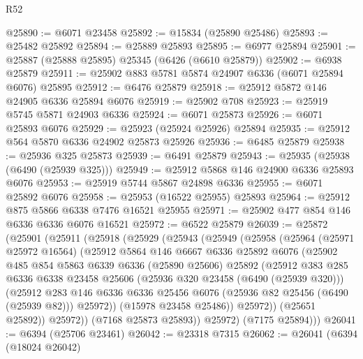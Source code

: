 \begin{lexlean}{R52}
\begin{coremodule}
@25890 := @6071 @23458
@25892 := @15834 (@25890 @25486)
@25893 := @25482 @25892
@25894 := @25889 @25893
@25895 := @6977 @25894
@25901 := @25887 (@25888 @25895) @25345 (@6426 (@6610 @25879))
@25902 := @6938 @25879
@25911 := @25902 @883 @5781 @5874 @24907 @6336 (@6071 @25894 @6076) @25895
@25912 := @6476 @25879
@25918 := @25912 @5872 @146 @24905 @6336 @25894 @6076
@25919 := @25902 @708
@25923 := @25919 @5745 @5871 @24903 @6336
@25924 := @6071 @25873
@25926 := @6071 @25893 @6076
@25929 := @25923 (@25924 @25926) @25894
@25935 := @25912 @564 @5870 @6336 @24902 @25873 @25926
@25936 := @6485 @25879
@25938 := @25936 @325 @25873
@25939 := @6491 @25879
@25943 := @25935 (@25938 (@6490 (@25939 @325)))
@25949 := @25912 @5868 @146 @24900 @6336 @25893 @6076
@25953 := @25919 @5744 @5867 @24898 @6336
@25955 := @6071 @25892 @6076
@25958 := @25953 (@16522 @25955) @25893
@25964 := @25912 @875 @5866 @6338 @7476 @16521 @25955
@25971 := @25902 @477 @854 @146 @6336 @6336 @6076 @16521
@25972 := @6522 @25879
@26039 := @25872
    (@25901
      (@25911
        (@25918
          (@25929
            (@25943
              (@25949
                (@25958
                  (@25964
                    (@25971 @25972 @16564)
                    (@25912
                      @5864
                      @146
                      @6667
                      @6336
                      @25892
                      @6076
                      (@25902
                        @485
                        @854
                        @5863
                        @6339
                        @6336
                        (@25890 @25606)
                        @25892
                        (@25912
                          @383
                          @285
                          @6336
                          @6338
                          @23458
                          @25606
                          (@25936 @320 @23458 (@6490 (@25939 @320)))
                          (@25912
                            @283
                            @146
                            @6336
                            @6336
                            @25456
                            @6076
                            (@25936 @82 @25456 (@6490 (@25939 @82)))
                            @25972))
                        (@15978 @23458 @25486))
                      @25972))
                  (@25651 @25892))
                @25972))
            (@7168 @25873 @25893))
          @25972)
        (@7175 @25894)))
@26041 := @6394 (@25706 @23461)
@26042 := @23318 @7315
@26062 := @26041
    (@6394
      (@18024 @26042)

\end{coremodule}
\end{lexlean}
